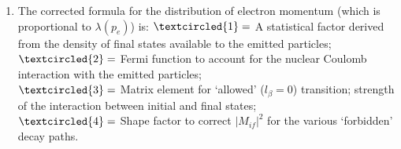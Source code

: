 \documentclass{school-22.101-notes}
\begin{document}
\begin{enumerate}
\item The corrected formula for the distribution of electron momentum (which is proportional to $\lambda(p_e)$) is:
$\textcircled{1}=$ A statistical factor derived from the density of final states available to the emitted particles; \\
$\textcircled{2}=$ Fermi function to account for the nuclear Coulomb interaction with the emitted particles;\\
$\textcircled{3}=$ Matrix element for `allowed' ($l_{\beta} = 0$) transition; strength of the interaction between initial and final states; \\
$\textcircled{4}=$ Shape factor to correct $|M_{if}|^2$ for the various `forbidden' decay paths.    
\end{enumerate}
\end{document}
